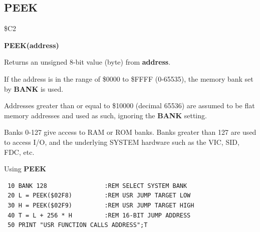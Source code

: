 
\newpage
\subsection{PEEK}
\begin{description}[leftmargin=2cm,style=nextline]
\item [Token:] \$C2
\item [Format:] {\bf PEEK(address)}
\item [Usage:]  Returns an unsigned 8-bit value (byte)
                from {\bf address}.

                If the address is in the range of \$0000 to \$FFFF (0-65535), the
                memory bank set by {\bf BANK} is used.

                Addresses greater than or equal to \$10000 (decimal 65536) are assumed to be flat memory
                addresses and used as such, ignoring the {\bf BANK} setting.

\item [Remarks:] Banks 0-127 give access to RAM or ROM banks.
                 Banks greater than 127 are used to access I/O, and the underlying SYSTEM hardware such as the
                 VIC, SID, FDC, etc.
\item [Example:] Using {\bf PEEK}

\begin{tcolorbox}[colback=black,coltext=white]
\verbatimfont{\codefont}
\begin{verbatim}
 10 BANK 128                :REM SELECT SYSTEM BANK
 20 L = PEEK($02F8)         :REM USR JUMP TARGET LOW
 30 H = PEEK($02F9)         :REM USR JUMP TARGET HIGH
 40 T = L + 256 * H         :REM 16-BIT JUMP ADDRESS
 50 PRINT "USR FUNCTION CALLS ADDRESS";T
\end{verbatim}
\end{tcolorbox}
\end{description}


\newpage
